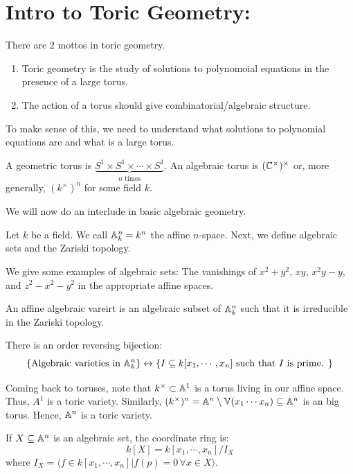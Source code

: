 \documentclass[12pt]{amsart}
\begin{document}



\section{Intro to Toric Geometry:}

There are $2$ mottos in toric geometry. 
\begin{enumerate}
    \item Toric geometry is the study of solutions to polynomoial equations in the presence of a large torus.
    \item The action of a torus should give combinatorial/algebraic structure.
\end{enumerate}

To make sense of this, we need to understand what solutions to polynomial equations are and what is a large torus. 

A geometric torus is $\underbrace{S^1 \times S^1 \times \cdots \times S^1}_{n \text{ times}}$. An algebraic torus is $(\mathbb C^\times)^\times$ or, more generally, $(k^\times)^n$ for some field $k$. 

We will now do an interlude in basic algebraic geometry. 

Let $k$ be a field. We call $\mathbb A_k^n = k^n$ the affine $n$-space. Next, we define algebraic sets and the Zariski topology. 

We give some examples of algebraic sets: The vanishings of $x^2+y^2$, $xy$, $x^2y-y$, and $z^2-x^2-y^2$ in the appropriate affine spaces. 

\begin{definition}
    An affine algebraic vareirt is an algebraic subset of $\mathbb A^n_k$ such that it is irreducible in the Zariski topology.
\end{definition}

\begin{theorem}[Nullstellensatz]
    There is an order reversing bijection:
    \[ \left\{\text{Algebraic varieties in $\mathbb A^n_k$} \right\} \leftrightarrow \left\{ I \subseteq k[x_1, \cdots, x_n] \text{ such that $I$ is prime. }\right\}\]
\end{theorem}

Coming back to toruses, note that $k^\times \subset \mathbb A^1$ is a torus living in our affine space. Thus, $A^1$ is a toric variety. Similarly, $(k^\times)^n = \mathbb A^n \setminus \mathbb V(x_1\cdots x_n) \subseteq \mathbb A^n$ is an big torus. Hence, $\mathbb A^n$ is a toric variety. 

\begin{definition}
    If $X \subseteq \mathbb A^n$ is an algebraic set, the coordinate ring is: 
    \[ k[X] = k[x_1,\cdots, x_n]/I_X\]
    where $I_X = \langle f \in k[x_1, \cdots, x_n] | f(p) = 0 \, \forall x \in X \rangle$.
\end{definition}
\end{document}
